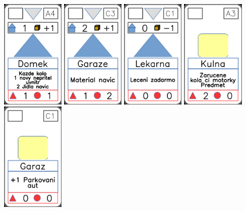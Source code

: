 \documentclass[a4paper]{article}
\begin{document}
	\includegraphics[width=3.0cm]{img-3_3}
	\includegraphics[width=3.0cm]{img-3_12}
	\includegraphics[width=3.0cm]{img-3_10}
	\includegraphics[width=3.0cm]{img-2_17}
	\includegraphics[width=3.0cm]{img-2_10}
\end{document}
